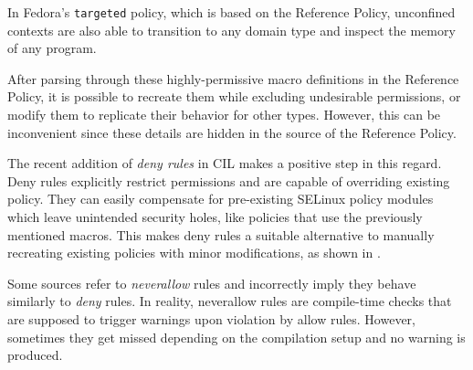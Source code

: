 In Fedora's \verb|targeted| policy, which is based on the Reference Policy, %
unconfined contexts are also able to transition to any domain type and inspect the memory of any program. %

After parsing through these highly-permissive macro definitions in the Reference Policy, it is possible to recreate them while excluding undesirable permissions,
or modify them to replicate their behavior for other types.
However, this can be inconvenient since these details are hidden in the source of the Reference Policy.

The recent addition of \emph{deny rules} in CIL makes a positive step in this regard.
Deny rules explicitly restrict permissions and are capable of overriding existing policy.
They can easily compensate for pre-existing SELinux policy modules which leave unintended security holes,
like policies that use the previously mentioned macros.
This makes deny rules a suitable alternative to manually recreating existing policies with minor modifications,
as shown in .

Some sources refer to \emph{neverallow} rules and incorrectly imply they behave similarly to \emph{deny} rules.
In reality, neverallow rules are compile-time checks that are supposed to trigger warnings upon violation by allow rules.
However, sometimes they get missed depending on the compilation setup and no warning is produced.